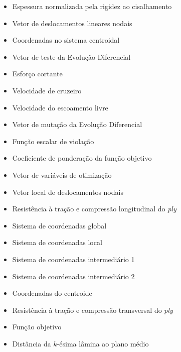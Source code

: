{\begin{itemize}[
        labelwidth=1.5cm,
        align=left,
        itemindent=0cm,
        leftmargin=2cm,
        itemsep=0em
    ]
    \item[$t^\ast$] Espessura normalizada pela rigidez ao cisalhamento
    \item[$\{\mathbf{u}\}$] Vetor de deslocamentos lineares nodais
    \item[$u,v,w$] Coordenadas no sistema centroidal
    \item[$\mathbf{u}$] Vetor de teste da Evolução Diferencial
    \item[$V$] Esforço cortante
    \item[$V_C$] Velocidade de cruzeiro
    \item[$\vv{V_\infty}$] Velocidade do escoamento livre
    \item[$\mathbf{v}$] Vetor de mutação da Evolução Diferencial
    \item[$v$] Função escalar de violação
    \item[$w_m$] Coeficiente de ponderação da função objetivo
    \item[$\mathbf{x}$] Vetor de variáveis de otimização
    \item[$\{\mathbf{x}\}$] Vetor local de deslocamentos nodais
    \item[$X, X'$] Resistência à tração e compressão longitudinal do \textit{ply}
    \item[$X,Y,Z$] Sistema de coordenadas global
    \item[$x,y,z$] Sistema de coordenadas local
    \item[$x',y',z'$] Sistema de coordenadas intermediário 1
    \item[$x'',y'',z''$] Sistema de coordenadas intermediário 2
    \item[$x_c, y_c$] Coordenadas do centroide
    \item[$Y, Y'$] Resistência à tração e compressão transversal do \textit{ply}
    \item[$z(\mathbf{x})$] Função objetivo
    \item[$z_k$] Distância da $k$-ésima lâmina ao plano médio
    
    \end{itemize}
}
